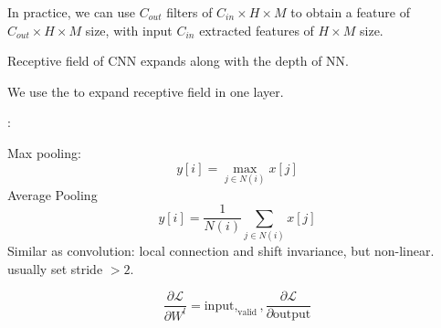 In practice, we can use  $ C_{out} $ filters of  $ C_{in}\times H\times M $  to obtain a feature of  $ C_{out}\times H\times M $ size, with input  $ C_{in} $ extracted features of  $ H\times M $  size. 

Receptive field of CNN expands along with the depth of NN.

We use the  to expand receptive field in one layer.

: 

Max pooling:
\[y[i]=\max_{j\in N(i)}x[j]\]
Average Pooling 
\[y[i]=\frac{1}{N(i)}\sum_{j\in N(i)}x[j]\]
Similar as convolution: local connection and shift invariance, but non-linear. usually set stride  $ >2 $.

\[
\frac{\partial \mathcal{L}}{\partial W^l} = \text{input} , _{\text{valid}} , \frac{\partial \mathcal{L}}{\partial \text{output}}
\]

